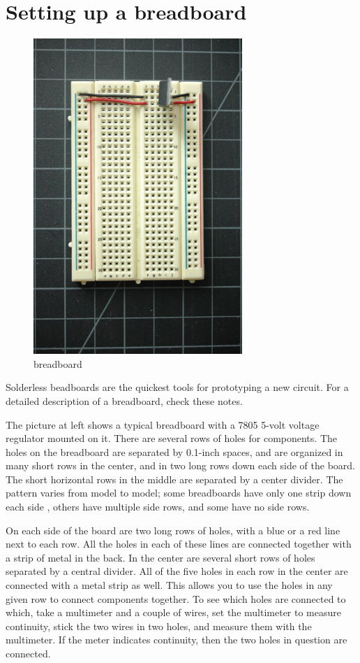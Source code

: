 \chapter{Setting up a breadboard}

\begin{figure}[!htb]
     \centering
     \includegraphics[scale=0.8]{img/breadboard/bboard_vreg_3.jpg}
     \caption{breadboard}
     \label{breadboard}
\end{figure}

Solderless beadboards are the quickest tools for prototyping a new circuit. For a detailed description of a breadboard, check these notes.

The picture at left shows a typical breadboard with a 7805 5-volt voltage regulator mounted on it. There are several rows of holes for components. The holes on the breadboard are separated by 0.1-inch spaces, and are organized in many short rows in the center, and in two long rows down each side of the board. The short horizontal rows in the middle are separated by a center divider. The pattern varies from model to model; some breadboards have only one strip down each side , others have multiple side rows, and some have no side rows.

On each side of the board are two long rows of holes, with a blue or a red line next to each row. All the holes in each of these lines are connected together with a strip of metal in the back. In the center are several short rows of holes separated by a central divider. All of the five holes in each row in the center are connected with a metal strip as well. This allows you to use the holes in any given row to connect components together. To see which holes are connected to which, take a multimeter and a couple of wires, set the multimeter to measure continuity, stick the two wires in two holes, and measure them with the multimeter. If the meter indicates continuity, then the two holes in question are connected.

